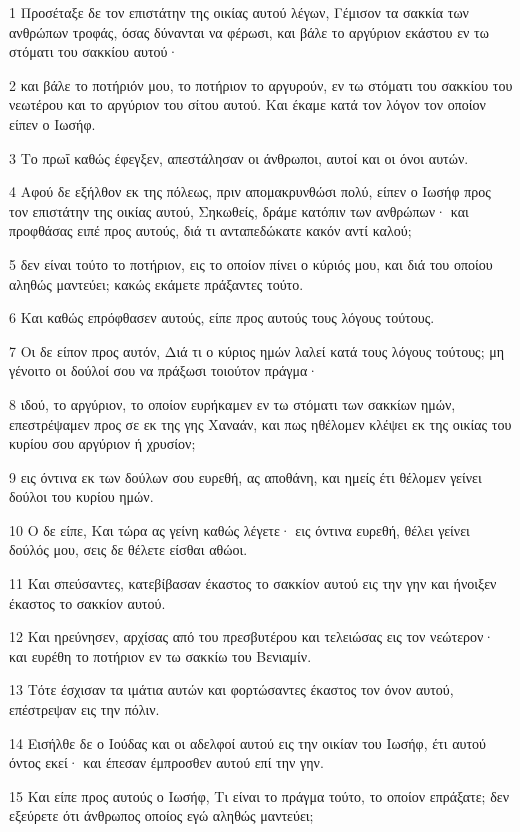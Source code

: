 \par 1 Προσέταξε δε τον επιστάτην της οικίας αυτού λέγων, Γέμισον τα σακκία των ανθρώπων τροφάς, όσας δύνανται να φέρωσι, και βάλε το αργύριον εκάστου εν τω στόματι του σακκίου αυτού·
\par 2 και βάλε το ποτήριόν μου, το ποτήριον το αργυρούν, εν τω στόματι του σακκίου του νεωτέρου και το αργύριον του σίτου αυτού. Και έκαμε κατά τον λόγον τον οποίον είπεν ο Ιωσήφ.
\par 3 Το πρωΐ καθώς έφεγξεν, απεστάλησαν οι άνθρωποι, αυτοί και οι όνοι αυτών.
\par 4 Αφού δε εξήλθον εκ της πόλεως, πριν απομακρυνθώσι πολύ, είπεν ο Ιωσήφ προς τον επιστάτην της οικίας αυτού, Σηκωθείς, δράμε κατόπιν των ανθρώπων· και προφθάσας ειπέ προς αυτούς, διά τι ανταπεδώκατε κακόν αντί καλού;
\par 5 δεν είναι τούτο το ποτήριον, εις το οποίον πίνει ο κύριός μου, και διά του οποίου αληθώς μαντεύει; κακώς εκάμετε πράξαντες τούτο.
\par 6 Και καθώς επρόφθασεν αυτούς, είπε προς αυτούς τους λόγους τούτους.
\par 7 Οι δε είπον προς αυτόν, Διά τι ο κύριος ημών λαλεί κατά τους λόγους τούτους; μη γένοιτο οι δούλοί σου να πράξωσι τοιούτον πράγμα·
\par 8 ιδού, το αργύριον, το οποίον ευρήκαμεν εν τω στόματι των σακκίων ημών, επεστρέψαμεν προς σε εκ της γης Χαναάν, και πως ηθέλομεν κλέψει εκ της οικίας του κυρίου σου αργύριον ή χρυσίον;
\par 9 εις όντινα εκ των δούλων σου ευρεθή, ας αποθάνη, και ημείς έτι θέλομεν γείνει δούλοι του κυρίου ημών.
\par 10 Ο δε είπε, Και τώρα ας γείνη καθώς λέγετε· εις όντινα ευρεθή, θέλει γείνει δούλός μου, σεις δε θέλετε είσθαι αθώοι.
\par 11 Και σπεύσαντες, κατεβίβασαν έκαστος το σακκίον αυτού εις την γην και ήνοιξεν έκαστος το σακκίον αυτού.
\par 12 Και ηρεύνησεν, αρχίσας από του πρεσβυτέρου και τελειώσας εις τον νεώτερον· και ευρέθη το ποτήριον εν τω σακκίω του Βενιαμίν.
\par 13 Τότε έσχισαν τα ιμάτια αυτών και φορτώσαντες έκαστος τον όνον αυτού, επέστρεψαν εις την πόλιν.
\par 14 Εισήλθε δε ο Ιούδας και οι αδελφοί αυτού εις την οικίαν του Ιωσήφ, έτι αυτού όντος εκεί· και έπεσαν έμπροσθεν αυτού επί την γην.
\par 15 Και είπε προς αυτούς ο Ιωσήφ, Τι είναι το πράγμα τούτο, το οποίον επράξατε; δεν εξεύρετε ότι άνθρωπος οποίος εγώ αληθώς μαντεύει;
